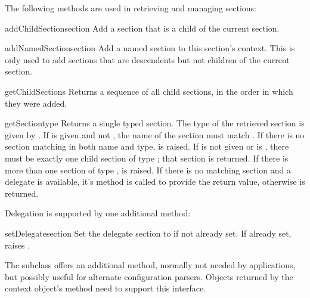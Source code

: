 \documentclass{howto}
\begin{document}
The following methods are used in retrieving and managing sections:

\begin{methoddesc}[Configuration]{addChildSection}{section}
  Add a section that is a child of the current section.
\end{methoddesc}

\begin{methoddesc}[Configuration]{addNamedSection}{section}
  Add a named section to this section's context.  This is only used to
  add sections that are descendents but not children of the current
  section.
\end{methoddesc}

\begin{methoddesc}[Configuration]{getChildSections}{}
  Returns a sequence of all child sections, in the order in which they
  were added.
\end{methoddesc}

\begin{methoddesc}[Configuration]{getSection}{type}
  Returns a single typed section.  The type of the retrieved section
  is given by .  If  is given and not ,
  the name of the section must match .  If there is no
  section matching in both name and type,  is
  raised.  If  is not given or is , there must be
  exactly one child section of type ; that section is
  returned.  If there is more than one section of type ,
   is raised.  If
  there is no matching section and a delegate is available, it's
   method is called to provide the return value,
  otherwise  is returned.
\end{methoddesc}

Delegation is supported by one additional method:

\begin{methoddesc}[Configuration]{setDelegate}{section}
  Set the delegate section to  if not already set.  If
  already set, raises .
\end{methoddesc}


The  subclass offers an additional
method, normally not needed by applications, but possibly useful for
alternate configuration parsers.  Objects returned by the
context object's  method need to
support this interface.
\end{document}
